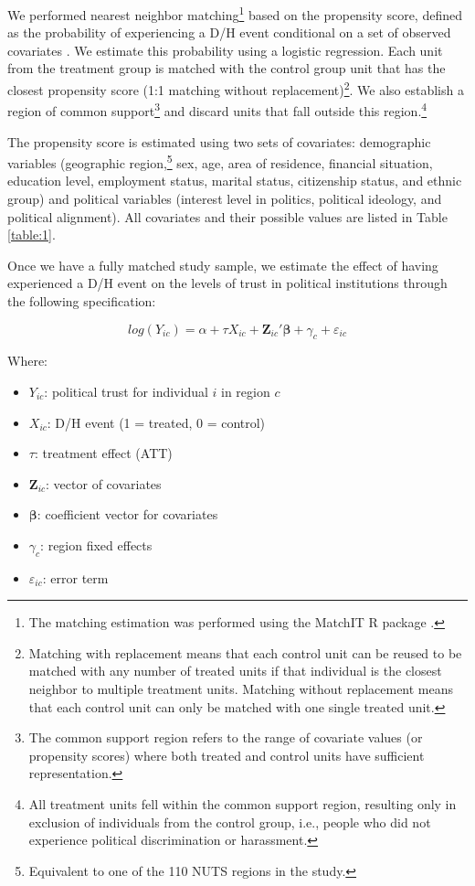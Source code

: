 \documentclass{article}
\begin{document}
We performed nearest neighbor matching\footnote{The matching estimation was performed using the MatchIT R package \parencite{ho_matchit_2011}.} based on the propensity score, defined as the probability of experiencing a D/H event conditional on a set of observed covariates \parencite{rubin_matching_1973, rosenbaum_central_1983}. We estimate this probability using a logistic regression. Each unit from the treatment group is matched with the control group unit that has the closest propensity score (1:1 matching without replacement)\footnote{Matching with replacement means that each control unit can be reused to be matched with any number of treated units if that individual is the closest neighbor to multiple treatment units. Matching without replacement means that each control unit can only be matched with one single treated unit.}. We also establish a region of common support\footnote{The common support region refers to the range of covariate values (or propensity scores) where both treated and control units have sufficient representation.} and discard units that fall outside this region.\footnote{All treatment units fell within the common support region, resulting only in exclusion of individuals from the control group, i.e., people who did not experience political discrimination or harassment.}

The propensity score is estimated using two sets of covariates: demographic variables (geographic region,\footnote{Equivalent to one of the 110 NUTS regions in the study.} sex, age, area of residence, financial situation, education level, employment status, marital status, citizenship status, and ethnic group) and political variables (interest level in politics, political ideology, and political alignment). All covariates and their possible values are listed in Table \ref{table:1}.

Once we have a fully matched study sample, we estimate the effect of having experienced a D/H event on the levels of trust in political institutions through the following specification:

\begin{equation}
\label{eq:1}
log(Y_{ic}) = \alpha + \tau X_{ic} + \mathbf{Z}_{ic}'\mathbf{\beta} + \gamma_c + \varepsilon_{ic}
\end{equation}

Where:
\begin{itemize}
  \item \( Y_{ic} \): political trust for individual \( i \) in region \( c \)
  \item \( X_{ic} \): D/H event (1 = treated, 0 = control)
  \item \( \tau \): treatment effect (ATT)
  \item \( \mathbf{Z}_{ic} \): vector of covariates
  \item \( \mathbf{\beta} \): coefficient vector for covariates
  \item \( \gamma_c \): region fixed effects
  \item \( \varepsilon_{ic} \): error term
\end{itemize}
\end{document}
